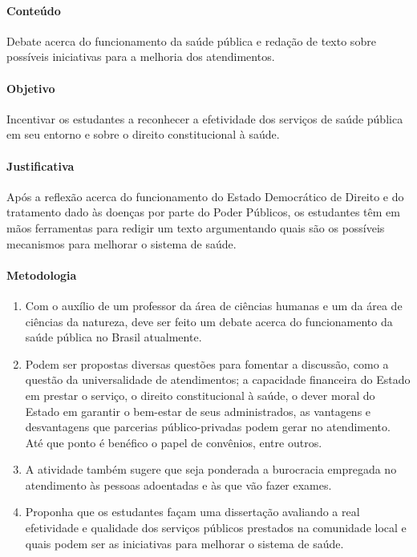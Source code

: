 \documentclass[12pt]{extarticle}
\begin{document}
\paragraph{Conteúdo} Debate acerca do funcionamento da saúde pública
e redação de texto sobre possíveis iniciativas para a melhoria dos atendimentos.

\paragraph{Objetivo} Incentivar os estudantes a reconhecer a efetividade
dos serviços de saúde pública em seu entorno e sobre o direito
constitucional à saúde.

\paragraph{Justificativa} Após a reflexão acerca do funcionamento do Estado Democrático de Direito
e do tratamento dado às doenças por parte do Poder Públicos, os estudantes 
têm em mãos ferramentas para redigir um texto argumentando quais são os 
possíveis mecanismos para melhorar o sistema de saúde.

\paragraph{Metodologia}

\begin{enumerate} 

\item Com o auxílio de um professor da área de ciências 
humanas e um da área de ciências da natureza, deve ser feito um debate
acerca do funcionamento da saúde pública no Brasil atualmente.

\item Podem ser propostas diversas questões para fomentar a discussão, como a
questão da universalidade de atendimentos; a capacidade financeira do
Estado em prestar o serviço, o direito constitucional à saúde, o dever
moral do Estado em garantir o bem-estar de seus administrados, as
vantagens e desvantagens que parcerias público-privadas podem gerar no
atendimento. Até que ponto é benéfico o papel de convênios, entre
outros.

\item A atividade também sugere que seja ponderada a burocracia
empregada no atendimento às pessoas adoentadas e às que vão
fazer exames.

\item Proponha que os estudantes façam uma dissertação
avaliando a real efetividade e qualidade dos serviços públicos prestados
na comunidade local e quais podem ser as iniciativas para melhorar o sistema de saúde.

\end{enumerate}
\end{document}

